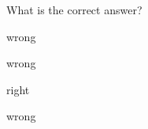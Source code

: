 \mult
What is the correct answer?

\begin{enumerate}[label={\scshape \alph*)}]
    \setcounter{enumii}{22}

    \ii
    wrong

    \ii 
    wrong

    \ii 
    right

    \ii 
    wrong

\end{enumerate}

